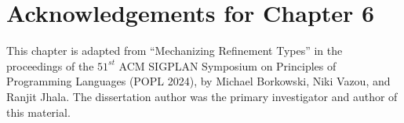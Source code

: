 \section*{Acknowledgements for Chapter 6}
%
This chapter is adapted from 
``Mechanizing Refinement Types'' in the proceedings of the 
$51^{st}$ ACM SIGPLAN Symposium on Principles of Programming
Languages (POPL 2024), by Michael Borkowski, Niki Vazou, and
Ranjit Jhala.
%
The dissertation author was the primary investigator 
and author of this material.

